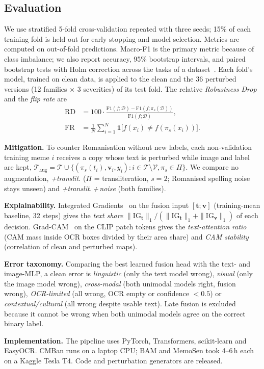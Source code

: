 \subsection{Evaluation}
\label{sec:method:eval}

We use stratified 5-fold cross-validation repeated with three seeds; 15\% of each training fold is held out for
early stopping and model selection. Metrics are computed on out-of-fold predictions. Macro-F1 is the primary metric
because of class imbalance; we also report accuracy, 95\% bootstrap intervals, and paired bootstrap tests with Holm
correction across the tasks of a dataset~\cite{holm1979}. Each fold's model, trained on clean data, is applied to the
clean and the 36 perturbed versions (12 families $\times$ 3 severities) of its test fold. The relative
\emph{Robustness Drop} and the \emph{flip rate} are
\begin{align}
\mathrm{RD}&=100\cdot\frac{\mathrm{F1}(f;\mathcal{D})-\mathrm{F1}(f;\pi_s(\mathcal{D}))}{\mathrm{F1}(f;\mathcal{D})},\\
\mathrm{FR}&=\frac{1}{N}\sum_{i=1}^{N}\mathbf{1}\big[f(x_i)\neq f(\pi_s(x_i))\big].
\end{align}

\textbf{Mitigation.} To counter Romanisation without new labels, each non-validation training meme $i$ receives a copy
whose text is perturbed while image and label are kept,
$\mathcal{T}_{\text{aug}}=\mathcal{T}\cup\{(\pi_s(t_i),\mathbf{v}_i,y_i): i\in\mathcal{T}\setminus\mathcal{V},
\pi_s\in\Pi\}$. We compare no augmentation, \emph{+translit.} ($\Pi$ = transliteration, $s=2$; Romanised spelling
noise stays unseen) and \emph{+translit.\,+\,noise} (both families).

\textbf{Explainability.} Integrated Gradients~\cite{sundararajan2017ig} on the fusion input
$[\mathbf{t};\mathbf{v}]$ (training-mean baseline, 32 steps) gives the \emph{text share}
$\|\mathrm{IG}_\mathbf{t}\|_1/(\|\mathrm{IG}_\mathbf{t}\|_1+\|\mathrm{IG}_\mathbf{v}\|_1)$ of each decision.
Grad-CAM~\cite{selvaraju2017gradcam} on the CLIP patch tokens gives the \emph{text-attention ratio} (CAM mass inside
OCR boxes divided by their area share) and \emph{CAM stability} (correlation of clean and perturbed maps).

\textbf{Error taxonomy.} Comparing the best learned fusion head with the text- and image-MLP, a clean error is
\emph{linguistic} (only the text model wrong), \emph{visual} (only the image model wrong), \emph{cross-modal} (both
unimodal models right, fusion wrong), \emph{OCR-limited} (all wrong, OCR empty or confidence $<0.5$) or
\emph{contextual/cultural} (all wrong despite usable text). Late fusion is excluded because it cannot be wrong when both
unimodal models agree on the correct binary label.

\textbf{Implementation.} The pipeline uses PyTorch, Transformers, scikit-learn and EasyOCR. CMBan runs on a laptop
CPU; BAM and MemoSen took 4--6\,h each on a Kaggle Tesla T4. Code and perturbation generators are released.
